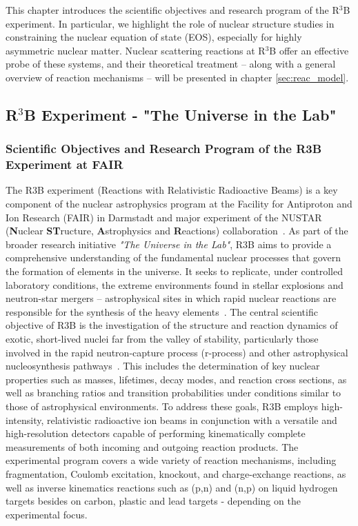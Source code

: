 This chapter introduces the scientific objectives and research program of the R$^3$B experiment. In particular, we highlight the role of nuclear structure studies in constraining the nuclear equation of state (EOS), especially for highly asymmetric nuclear matter. Nuclear scattering reactions at R$^3$B offer an effective probe of these systems, and their theoretical treatment -- along with a general overview of reaction mechanisms -- will be presented in chapter \ref{sec:reac_model}.

\subsection{R$^3$B Experiment - "The Universe in the Lab"}
\subsubsection{Scientific Objectives and Research Program of the R3B Experiment at FAIR}
The R3B experiment (Reactions with Relativistic Radioactive Beams) is a key component of the nuclear astrophysics program at the Facility for Antiproton and Ion Research (FAIR) in Darmstadt and major experiment of the NUSTAR (\textbf{N}uclear \textbf{ST}ructure, \textbf{A}strophysics and \textbf{R}eactions) collaboration~\cite{krucken2005nustar}.\newline
As part of the broader research initiative \textit{"The Universe in the Lab"}, R3B aims to provide a comprehensive understanding of the fundamental nuclear processes that govern the formation of elements in the universe. It seeks to replicate, under controlled laboratory conditions, the extreme environments found in stellar explosions and neutron-star mergers -- astrophysical sites in which rapid nuclear reactions are responsible for the synthesis of the heavy elements~\cite{thielemann2017neutron}.\newline
The central scientific objective of R3B is the investigation of the structure and reaction dynamics of exotic, short-lived nuclei far from the valley of stability, particularly those involved in the rapid neutron-capture process (r-process) and other astrophysical nucleosynthesis pathways~\cite{horowitz2019r}. This includes the determination of key nuclear properties such as masses, lifetimes, decay modes, and reaction cross sections, as well as branching ratios and transition probabilities under conditions similar to those of astrophysical environments.\newline
To address these goals, R3B employs high-intensity, relativistic radioactive ion beams in conjunction with a versatile and high-resolution detectors capable of performing kinematically complete measurements of both incoming and outgoing reaction products. The experimental program covers a wide variety of reaction mechanisms, including fragmentation, Coulomb excitation, knockout, and charge-exchange reactions, as well as inverse kinematics reactions such as (p,n) and (n,p) on liquid hydrogen targets besides on carbon, plastic and lead targets - depending on the experimental focus.\newline
